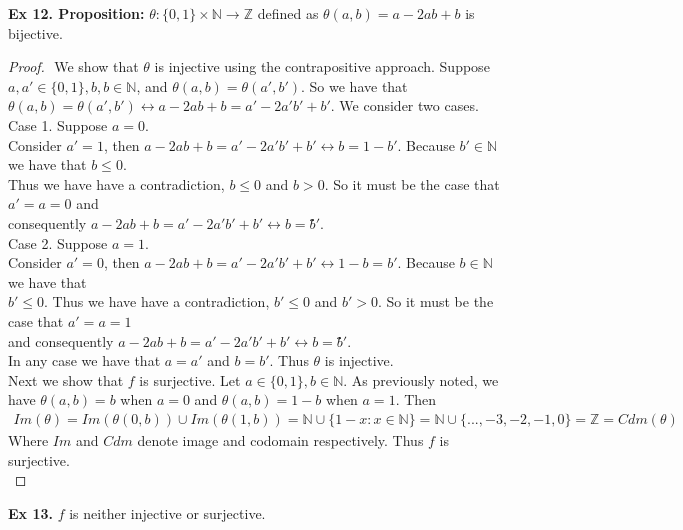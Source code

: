 \documentclass{article}
\begin{document}
\noindent \textbf{Ex 12. Proposition:} $\theta: \{0,1\} \times \mathbb{N} \rightarrow \mathbb{Z}$ defined as $\theta(a, b)=a-2ab+b$ is bijective.
\begin{proof}
$ $\newline
We show that $\theta$ is injective using the contrapositive approach. Suppose $a, a' \in \{0, 1\}, b, b \in \mathbb{N}$, and $\theta(a,b)=\theta(a', b')$. So we have that $\theta(a, b)=\theta(a', b') \leftrightarrow a-2ab+b=a'-2a'b'+b'$. We consider two cases.\\

\noindent Case 1. Suppose $a=0$.\\
\indent Consider $a'=1$, then $a-2ab+b=a'-2a'b'+b' \leftrightarrow b = 1 - b'$. Because $b' \in \mathbb{N}$ we have that $b \leq 0$.\\
\indent Thus we have have a contradiction, $b \leq 0$ and $b > 0$. So it must be the case that $a' = a = 0$ and\\\indent consequently $a-2ab+b=a'-2a'b'+b' \leftrightarrow b = b̈́'$.\\

\noindent Case 2. Suppose $a=1$.\\
\indent Consider $a' = 0$, then $a-2ab+b=a'-2a'b'+b' \leftrightarrow 1-b=b'$. Because $b \in \mathbb{N}$ we have that\\
\indent $b' \leq 0$. Thus we have have a contradiction, $b' \leq 0$ and $b' > 0$. So it must be the case that $a' = a = 1$\\
\indent and consequently $a-2ab+b=a'-2a'b'+b' \leftrightarrow b = b̈́'$.\\

\noindent In any case we have that $a=a'$ and $b=b'$. Thus $\theta$ is injective.\\

\noindent Next we show that $f$ is surjective. Let $a \in \{0, 1\}, b \in \mathbb{N}$. As previously noted, we have $\theta(a, b)=b$ when $a=0$ and $\theta(a,b)=1-b$ when $a=1$. Then
\begin{align*}
Im(\theta) = Im(\theta(0, b)) \cup Im(\theta(1, b)) = \mathbb{N} \cup \{1-x : x \in \mathbb{N}\} = \mathbb{N} \cup \{...,-3,-2,-1,0\} =\mathbb{Z}=Cdm(\theta)
\end{align*}
Where $Im$ and $Cdm$ denote image and codomain respectively. Thus $f$ is surjective.\\
\end{proof}

\noindent \textbf{Ex 13.} $f$ is neither injective or surjective.\\
\end{document}
